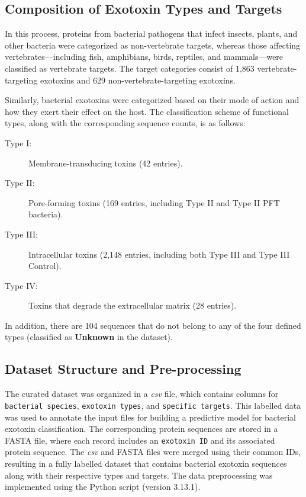 \subsection{Composition of Exotoxin Types and Targets}

In this process, proteins from bacterial pathogens that infect insects, plants, and other bacteria were categorized as non-vertebrate targets, whereas those affecting vertebrates—including fish, amphibians, birds, reptiles, and mammals—were classified as vertebrate targets.
The target categories consist of 1,863 vertebrate-targeting exotoxins and 629 non-vertebrate-targeting exotoxins.

Similarly, bacterial exotoxins were categorized based on their mode of action and how they exert their effect on the host.
The classification scheme of functional types, along with the corresponding sequence counts, is as follows:
\begin{description}
	\item[Type I:] Membrane-transducing toxins (42 entries).
	\item[Type II:] Pore-forming toxins (169 entries, including Type II and Type II PFT bacteria).
	\item[Type III:] Intracellular toxins (2,148 entries, including both Type III and Type III Control).
	\item[Type IV:] Toxins that degrade the extracellular matrix (28 entries).
\end{description}

In addition, there are 104 sequences that do not belong to any of the four defined types (classified as \textbf{Unknown} in the dataset).

\subsection{Dataset Structure and Pre-processing}

The curated dataset was organized in a \textit{csv} file, which contains columns for \texttt{bacterial species}, \texttt{exotoxin types}, and \texttt{specific targets}. This labelled data was used to annotate the input files for building a predictive model for bacterial exotoxin classification. The corresponding protein sequences are stored in a FASTA file, where each record includes an \texttt{exotoxin ID} and its associated protein sequence. The \textit{csv} and FASTA files were merged using their common IDs, resulting in a fully labelled dataset that contains bacterial exotoxin sequences along with their respective types and targets. The data preprocessing was implemented using the Python script (version 3.13.1).

